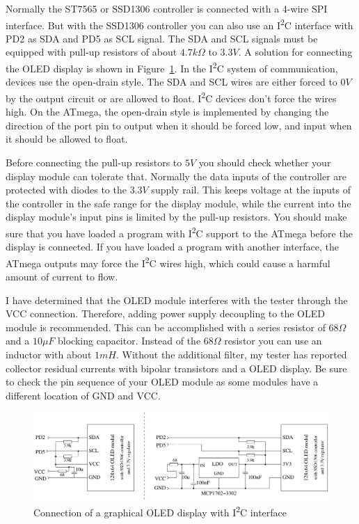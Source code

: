 Normally the ST7565 or SSD1306 controller is connected with a 4-wire SPI interface.
But with the SSD1306 controller you can also use an I\textsuperscript{2}C interface
with PD2 as SDA and PD5 as SCL signal.
The SDA and SCL signals must be equipped with pull-up resistors of about \(4.7k\Omega\) to \(3.3V\).
A solution for connecting the OLED display is shown in Figure~\ref{fig:ssd1306i2c}.
In the I\textsuperscript{2}C system of communication, devices use the open-drain style.
The SDA and SCL wires are either forced to \(0V\) by the output circuit or are allowed to float.
I\textsuperscript{2}C devices don't force the wires high.
On the ATmega, the open-drain style is implemented by changing the direction of the port pin
to output when it should be forced low, and input when it should be allowed to float.

Before connecting the pull-up resistors to \(5V\) you should check whether your display module can tolerate that.
Normally the data inputs of the controller are protected with diodes to the \(3.3V\) supply rail.
This keeps voltage at the inputs of the controller in the safe range for the display module,
while the current into the display module's input pins is limited by the pull-up resistors.
You should make sure that you have loaded a program with I\textsuperscript{2}C support to the ATmega 
before the display is connected. If you have loaded a program with another interface, 
the ATmega outputs may force the I\textsuperscript{2}C wires high,
which could cause a harmful amount of current to flow.

I have determined that the OLED module interferes with the tester through the VCC connection.
Therefore, adding power supply decoupling to the OLED module is recommended.
This can be accomplished with a series resistor of \(68\Omega\) and a \(10\mu F\) blocking capacitor.
Instead of the \(68\Omega\) resistor you can use an inductor with about \(1mH\).
Without the additional filter, my tester has reported collector residual currents with bipolar transistors and a
OLED display.
Be sure to check the pin sequence of your OLED module as some modules have a different location of GND and VCC.
 
\begin{figure}[H]
\centering
\includegraphics[width=.814\textwidth]{../FIG/SSD1306_I2C.pdf}
\caption{Connection of a graphical OLED display with I\textsuperscript{2}C interface}
\label{fig:ssd1306i2c}
\end{figure}

